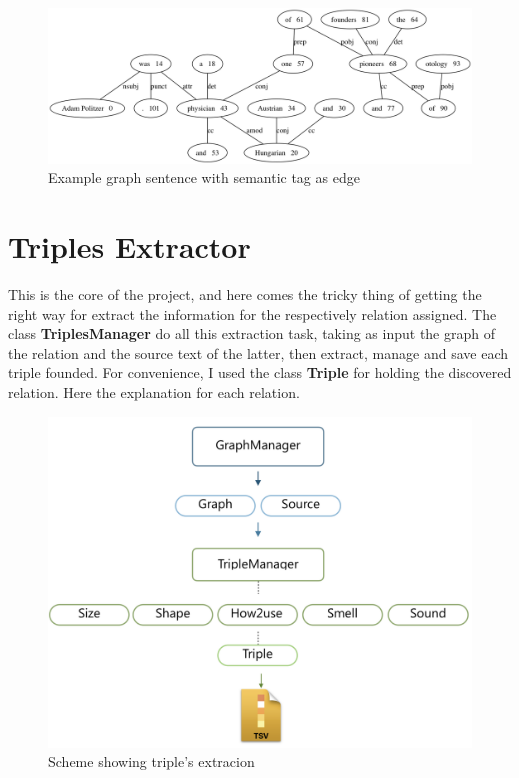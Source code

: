 \documentclass[conference,compsoc]{IEEEtran}
\begin{document}
\begin{figure}[h]
\centering
\includegraphics[scale=0.23]{graph}
\caption{ Example graph sentence with semantic tag as edge }
\end{figure}



\section{Triples Extractor}
This is the core of the project, and here comes the tricky thing of getting the right way for extract the information for the respectively relation assigned. The class \textbf{TriplesManager} do all this extraction task, taking as input the graph of the relation and the source text of the latter, then extract,  manage and save each triple founded. For convenience, I used the class \textbf{Triple} for holding the discovered relation.
Here the explanation for each relation.


\begin{figure}[h]
\centering
\includegraphics[scale=0.28]{triplemanager}
\caption{ Scheme showing triple's extracion}
\end{figure}
\end{document}
